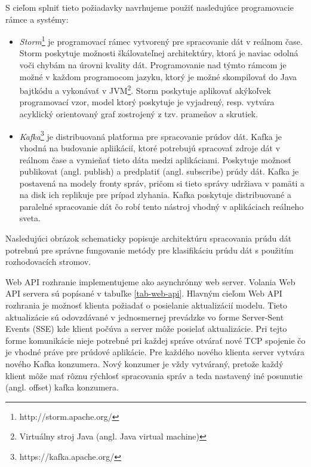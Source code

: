 S cieľom splniť tieto požiadavky navrhujeme použiť nasledujúce programovacie rámce a systémy:
\begin{itemize}
	\item \textit{Storm}\footnote{http://storm.apache.org/} je programovací rámec vytvorený pre spracovanie dát v reálnom čase. Storm poskytuje možnosti škálovateľnej architektúry, ktorá je naviac odolná voči chybám na úrovni kvality dát. Programovanie nad týmto rámcom je možné v každom programocom jazyku, ktorý je možné skompilovať do Java bajtkódu a vykonávať v JVM\footnote{Virtuálny stroj Java (angl. Java virtual machine)}. Storm poskytuje aplikovať akýkoľvek programovací vzor, model ktorý poskytuje je vyjadrený, resp. vytvára acyklický orientovaný graf zostrojený z tzv. prameňov a skrutiek.
	\item \textit{Kafka}\footnote{https://kafka.apache.org/} je distribuovaná platforma pre spracovanie prúdov dát. Kafka je vhodná na budovanie apliikácií, ktoré potrebujú spracovať zdroje dát v reálnom čase a vymieňať tieto dáta medzi aplikáciami. Poskytuje možnosť publikovat (angl. publish) a predplatiť (angl. subscribe) prúdy dát. Kafka je postavená na modely fronty správ, pričom si tieto správy udržiava v pamäti a na disk ich replikuje pre prípad zlyhania. Kafka poskytuje distribuované a paralelné spracovanie dát čo robí tento nástroj vhodný v aplikáciach reálneho sveta.
\end{itemize}

Nasledujúci obrázok schematicky popisuje architektúru spracovania prúdu dát potrebnú pre správne fungovanie metódy pre klasifikáciu prúdu dát s použitím rozhodovacích stromov.
\label{fig:architecture}
\par
Web API rozhranie implementujeme ako asynchrónny web server. Volania Web API servera sú popísané v tabuľke \ref{tab-web-api}. Hlavným cieľom Web API rozhrania je možnosť klienta požiadať o posielanie aktualizácií modelu. Tieto aktualizácie sú odovzdávané v jednosmernej prevádzke vo forme Server-Sent Events (SSE) kde klient počúva a server môže posielať aktualizácie. Pri tejto forme komunikácie nieje potrebné pri každej správe otvárať nové TCP spojenie čo je vhodné práve pre prúdové aplikácie. Pre každého nového klienta server vytvára nového Kafka konzumera. Nový konzumer je vždy vytváraný, pretože každý klient môže mať rôznu rýchlosť spracovania správ a teda nastavený iné posunutie (angl. offset) kafka konzumera.

